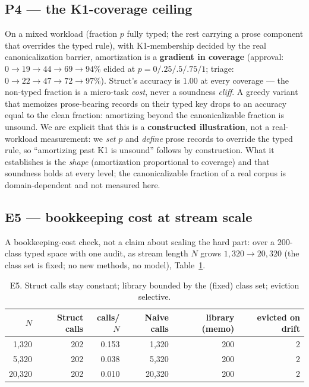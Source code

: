 \documentclass[11pt]{article}
\newcommand{\K}{\textsf{K1}}
\begin{document}
\subsection{P4 --- the \K{}-coverage ceiling}
On a mixed workload (fraction $p$ fully typed; the rest carrying a prose component that overrides the typed rule),
with \K{}-membership decided by the real canonicalization barrier, amortization is a \textbf{gradient in coverage}
(approval: $0\to19\to44\to69\to94\%$ elided at $p=0/.25/.5/.75/1$; triage: $0\to22\to47\to72\to97\%$). Struct's
accuracy is $1.00$ at every coverage --- the non-typed fraction is a micro-task \emph{cost}, never a soundness
\emph{cliff}. A greedy variant that memoizes prose-bearing records on their typed key drops to an accuracy equal to
the clean fraction: amortizing beyond the canonicalizable fraction is unsound. We are explicit that this is a
\textbf{constructed illustration}, not a real-workload measurement: we \emph{set} $p$ and \emph{define} prose
records to override the typed rule, so ``amortizing past \K{} is unsound'' follows by construction. What it
establishes is the \emph{shape} (amortization proportional to coverage) and that soundness holds at every level; the
canonicalizable fraction of a real corpus is domain-dependent and not measured here.

\subsection{E5 --- bookkeeping cost at stream scale}
A bookkeeping-cost check, not a claim about scaling the hard part: over a 200-class typed space with one audit, as
stream length $N$ grows $1{,}320\to20{,}320$ (the class set is fixed; no new methods, no model), Table~\ref{tab:e5}.

\begin{table}[h]\centering
\begin{tabular}{rrrrrr}
\toprule
$N$ & Struct calls & calls/$N$ & Naive calls & library (memo) & evicted on drift \\
\midrule
1{,}320 & 202 & 0.153 & 1{,}320 & 200 & 2 \\
5{,}320 & 202 & 0.038 & 5{,}320 & 200 & 2 \\
20{,}320 & 202 & 0.010 & 20{,}320 & 200 & 2 \\
\bottomrule
\end{tabular}
\caption{E5. Struct calls stay constant; library bounded by the (fixed) class set; eviction selective.}
\label{tab:e5}
\end{table}
\end{document}
